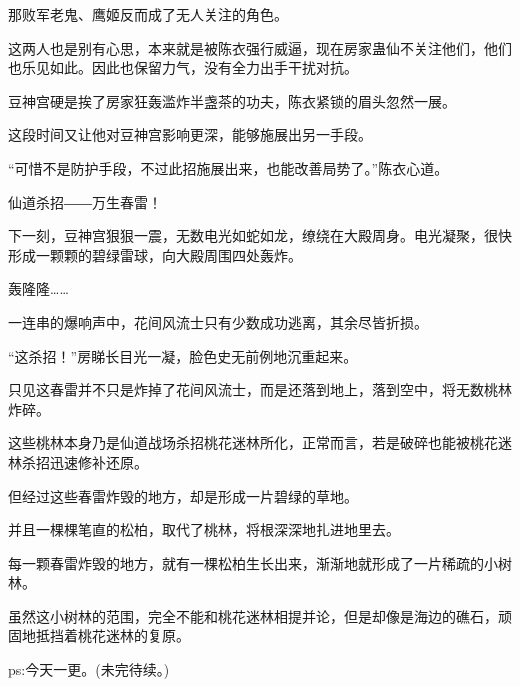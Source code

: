 \begin{this_body}
那败军老鬼、鹰姬反而成了无人关注的角色。

这两人也是别有心思，本来就是被陈衣强行威逼，现在房家蛊仙不关注他们，他们也乐见如此。因此也保留力气，没有全力出手干扰对抗。

豆神宫硬是挨了房家狂轰滥炸半盏茶的功夫，陈衣紧锁的眉头忽然一展。

这段时间又让他对豆神宫影响更深，能够施展出另一手段。

“可惜不是防护手段，不过此招施展出来，也能改善局势了。”陈衣心道。

仙道杀招――万生春雷！

下一刻，豆神宫狠狠一震，无数电光如蛇如龙，缭绕在大殿周身。电光凝聚，很快形成一颗颗的碧绿雷球，向大殿周围四处轰炸。

轰隆隆……

一连串的爆响声中，花间风流士只有少数成功逃离，其余尽皆折损。

“这杀招！”房睇长目光一凝，脸色史无前例地沉重起来。

只见这春雷并不只是炸掉了花间风流士，而是还落到地上，落到空中，将无数桃林炸碎。

这些桃林本身乃是仙道战场杀招桃花迷林所化，正常而言，若是破碎也能被桃花迷林杀招迅速修补还原。

但经过这些春雷炸毁的地方，却是形成一片碧绿的草地。

并且一棵棵笔直的松柏，取代了桃林，将根深深地扎进地里去。

每一颗春雷炸毁的地方，就有一棵松柏生长出来，渐渐地就形成了一片稀疏的小树林。

虽然这小树林的范围，完全不能和桃花迷林相提并论，但是却像是海边的礁石，顽固地抵挡着桃花迷林的复原。

ps:今天一更。(未完待续。)

\end{this_body}

